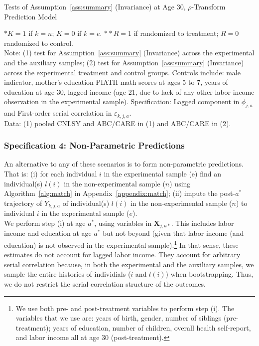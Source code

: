\begin{table}[H] 
\begin{threeparttable}
\caption{Tests of Assumption~\ref{ass:summary} (Invariance) at Age 30, $\rho$-Transform Prediction Model}
\label{table:invariance}
\centering 

\end{threeparttable}
\end{table}
\begin{spacing}{1}
\begin{footnotesize}
\noindent $* K= 1$ if $k = n$; $K = 0$ if $k = e$. $** R= 1$ if randomized to treatment; $R = 0$ randomized to control. \\ 
\noindent Note: (1) test for Assumption~\ref{ass:summary} (Invariance) across the experimental and the auxiliary samples; (2) test for Assumption~\ref{ass:summary} (Invariance) across the experimental treatment and control groups. Controls include: male indicator, mother's education PIATH math scores at ages 5 to 7, years of education at age 30, lagged income (age 21, due to lack of any other labor income observation in the experimental sample).
\noindent Specification: Lagged component in $\phi_{j,a}$ and First-order serial correlation in $\varepsilon_{k,j,a}$.\\ 
\noindent Data: (1) pooled CNLSY and ABC/CARE in (1) and ABC/CARE in (2). 
\end{footnotesize}
\end{spacing}

\subsubsection{Specification 4: Non-Parametric Predictions}

\noindent An alternative to any of these scenarios is to form non-parametric predictions. That is: (i) for each individual $i$ in the experimental sample (e) find an individual(s) $l(i)$ in the non-experimental sample ($n$) using Algorithm~\ref{alg:match} in Appendix~\ref{appendix:match}; (ii) impute the post-$a^*$ trajectory of $Y_{k,j,a}$ of individual(s) $l(i)$ in the non-experimental sample ($n$) to individual $i$ in the experimental sample ($e$).\\ 

\noindent We perform step (i) at age $a^*$, using variables in $\bm{X}_{j,a*}$. This includes labor income and education at age $a^*$ but not beyond (given that labor income (and education) is not observed in the experimental sample).\footnote{We use both pre- and post-treatment variables to perform step (i). The variables that we use are: years of birth, gender, number of siblings (pre-treatment); years of education, number of children, overall health self-report, and labor income all at age 30 (post-treatment).} In that sense, these estimates do not account for lagged labor income. They account for arbitrary serial correlation because, in both the experimental and the auxiliary samples, we sample the entire histories of individials ($i$ and $l(i)$) when bootstrapping. Thus, we do not restrict the serial correlation structure of the outcomes.\\



\singlespace






